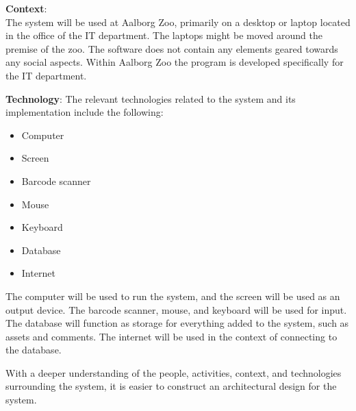 \textbf{Context}: \\
The system will be used at Aalborg Zoo, primarily on a desktop or laptop located in the office of the IT department. The laptops might be moved around the premise of the zoo. The software does not contain any elements geared towards any social aspects. Within Aalborg Zoo the program is developed specifically for the IT department.
\par
 
\textbf{Technology}:
The relevant technologies related to the system and its implementation include the following:

\begin{itemize}
    \setlength\itemsep{0.05em}
    \item Computer
    \item Screen
    \item Barcode scanner
    \item Mouse
    \item Keyboard
    \item Database
    \item Internet
\end{itemize}

The computer will be used to run the system, and the screen will be used as an output device. The barcode scanner, mouse, and keyboard will be used for input. The database will function as storage for everything added to the system, such as assets and comments. The internet will be used in the context of connecting to the database.
\par
With a deeper understanding of the people, activities, context, and technologies surrounding the system, it is easier to construct an architectural design for the system.